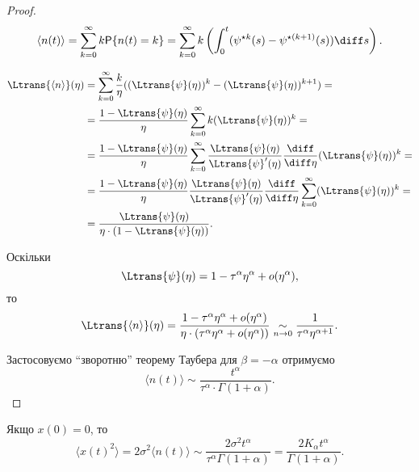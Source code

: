 \begin{proof}
    \begin{equation}
        \langle n(t) \rangle = \sum_{k = 0}^\infty k \mathsf{P}\{n (t) = k\} = \sum_{k = 0}^\infty k \left( \int_0^t ( \psi^{\star k}(s) - \psi^{\star (k + 1)}(s) ) \diff s \right).
    \end{equation}

    \begin{equation}
        \begin{aligned}
            \Ltrans{\langle n \rangle} (\eta)
            &= \sum_{k = 0}^\infty \frac{k}{\eta} ( (\Ltrans{\psi}(\eta))^k - (\Ltrans{\psi}(\eta))^{k + 1} ) = \\
            &= \frac{1 - \Ltrans{\psi}(\eta)}{\eta} \sum_{k = 0}^\infty k (\Ltrans{\psi}(\eta))^k = \\
            &= \frac{1 - \Ltrans{\psi}(\eta)}{\eta} \sum_{k = 0}^\infty \frac{\Ltrans{\psi}(\eta)}{\Ltrans{\psi}'(\eta)} \frac{\diff}{\diff \eta} (\Ltrans{\psi}(\eta))^k = \\
            &= \frac{1 - \Ltrans{\psi}(\eta)}{\eta} \frac{\Ltrans{\psi}(\eta)}{\Ltrans{\psi}'(\eta)} \frac{\diff}{\diff \eta} \sum_{k = 0}^\infty (\Ltrans{\psi}(\eta))^k = \\
            &= \frac{\Ltrans{\psi}(\eta)}{\eta \cdot (1 - \Ltrans{\psi}(\eta))}.
        \end{aligned}
    \end{equation}

    Оскільки
    \begin{equation}
        \Ltrans{\psi}(\eta) = 1 - \tau^\alpha \eta^\alpha + o(\eta^\alpha),
    \end{equation}
    то
    \begin{equation}
        \Ltrans{\langle n \rangle} (\eta) = \frac{1 - \tau^\alpha \eta^\alpha + o(\eta^\alpha)}{\eta \cdot (\tau^\alpha \eta^\alpha + o(\eta^\alpha))} \underset{n \to 0}{\sim} \frac{1}{\tau^\alpha \eta^{\alpha + 1}}.
    \end{equation}

    Застосовуємо ``зворотню'' теорему Таубера для $\beta = - \alpha$ отримуємо
    \begin{equation}
        \langle n(t) \rangle \sim \frac{t^\alpha}{\tau^\alpha \cdot \Gamma(1 + \alpha)}.
    \end{equation}
\end{proof}

\begin{corollary}
    Якщо $x(0) = 0$, то
    \begin{equation}
        \langle x(t)^2 \rangle = 2 \sigma^2 \langle n(t) \rangle \sim \frac{2 \sigma^2 t^\alpha}{\tau^\alpha \Gamma(1 + \alpha)} = \frac{2 K_\alpha t^\alpha}{\Gamma(1 + \alpha)}.
    \end{equation}
\end{corollary}

